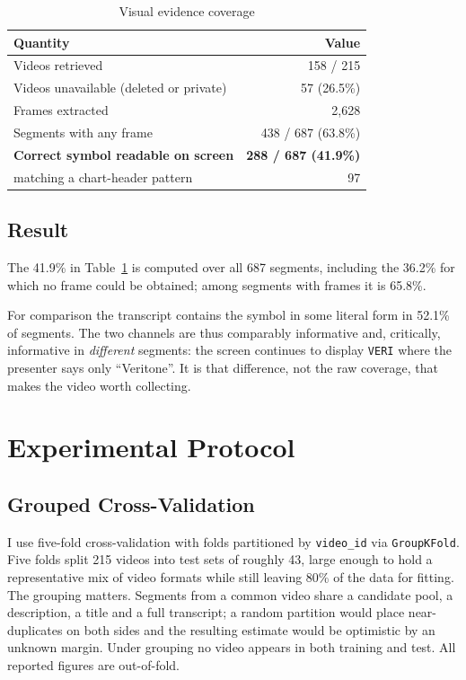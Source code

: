 \documentclass[conference]{IEEEtran}
\begin{document}
\begin{table}[htbp]
\caption{Visual evidence coverage}
\label{tab:ocr}
\centering
\begin{tabular}{lr}
\toprule
Quantity & Value \\
\midrule
Videos retrieved & 158 / 215 \\
Videos unavailable (deleted or private) & 57 (26.5\%) \\
Frames extracted & 2{,}628 \\
Segments with any frame & 438 / 687 (63.8\%) \\
\textbf{Correct symbol readable on screen} & \textbf{288 / 687 (41.9\%)} \\
\quad matching a chart-header pattern & 97 \\
\bottomrule
\end{tabular}
\end{table}

\subsection{Result}

The 41.9\% in Table~\ref{tab:ocr} is computed over all 687 segments, including
the 36.2\% for which no frame could be obtained; among segments with frames it
is 65.8\%.

For comparison the transcript contains the symbol in some literal form in
52.1\% of segments. The two
channels are thus comparably informative and, critically, informative in
\emph{different} segments: the screen continues to display \texttt{VERI} where
the presenter says only ``Veritone''. It is that difference, not the raw coverage, that makes the
video worth collecting.

\section{Experimental Protocol}

\subsection{Grouped Cross-Validation}

I use five-fold cross-validation with folds partitioned by \texttt{video\_id}
via \texttt{GroupKFold}. Five folds split 215 videos into test sets of roughly
43, large enough to hold a representative mix of video formats while still
leaving 80\% of the data for fitting. The grouping matters. Segments from a
common video share a candidate pool, a description, a title and a full
transcript; a
random partition would place near-duplicates on both sides and the resulting
estimate would be optimistic by an unknown margin. Under grouping no video
appears in both training and test. All reported figures are out-of-fold.
\end{document}

